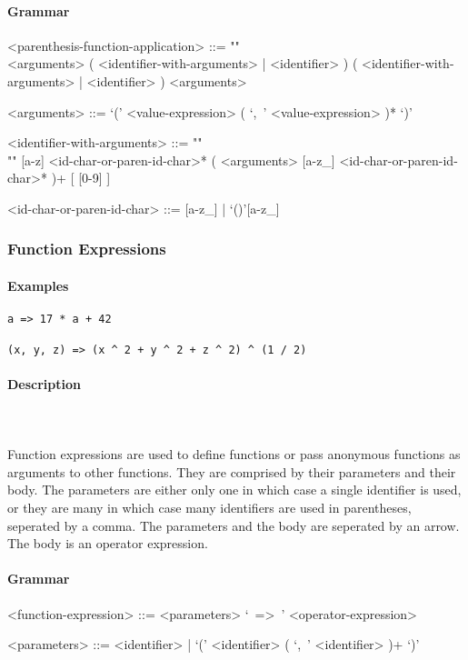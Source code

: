 \documentclass{article}
\def\pend{\mbox{} \\\\}
\begin{document}
\paragraph{Grammar}
\begin{grammar}
<parenthesis-function-application> ::= ""\\
<arguments> ( <identifier-with-arguments> | <identifier> )
\alt ( <identifier-with-arguments> | <identifier> ) <arguments>

<arguments> ::= `(' <value-expression> ( `,\ ' <value-expression> )* `)'

<identifier-with-arguments> ::= ""\\""
[a-z] <id-char-or-paren-id-char>* ( <arguments> [a-z_]
<id-char-or-paren-id-char>* )+ [ [0-9] ]

<id-char-or-paren-id-char> ::= [a-z_] | `()'[a-z_]
\end{grammar}

\subsubsection{Function Expressions}

\paragraph{Examples}

\begin{verbatim}
a => 17 * a + 42

(x, y, z) => (x ^ 2 + y ^ 2 + z ^ 2) ^ (1 / 2)
\end{verbatim}

\paragraph{Description}\pend
Function expressions are used to define functions or pass anonymous functions as 
arguments to other functions. They are comprised by their parameters and their 
body. The parameters are either only one in which case a single identifier is used, 
or they are many in which case many identifiers are used in parentheses, seperated 
by a comma. The parameters and the body are seperated by an arrow.
The body is an operator expression.

\paragraph{Grammar}
\begin{grammar}
<function-expression> ::= <parameters> `\ =>\ ' <operator-expression>

<parameters> ::= <identifier> | `(' <identifier> ( `,\ ' <identifier> )+ `)'
\end{grammar}
\end{document}
